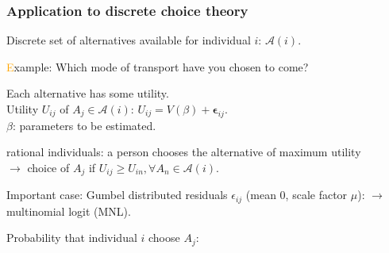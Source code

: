\documentclass{beamer}
\begin{document}
\begin{frame}[fragile]
\frametitle{Application to discrete choice theory}
		
			Discrete {\blue set of alternatives} available for individual $i$:
			$\mathcal{A}(i)$.
			
			\textcolor{orange}Example: Which mode of transport have you chosen to come?
			
			\vspace*{0.3cm}
			
			\begin{minipage}[c]{0.3\linewidth}
				\begin{center}
				\end{center}%
			\end{minipage}
			\begin{minipage}{0.68\linewidth}
				
				Each alternative has some utility.\\
				{\red Utility $U_{ij}$} of $A_j \in \mathcal{A}(i)$:
				$U_{i j} = V(\beta) + \boldsymbol{\epsilon}_{ij}.$\\
				$\beta$: parameters to be estimated.
				
				{\red rational individuals}: a person chooses
				the alternative of {\blue maximum utility}\\
				{\red $\rightarrow$} choice of $A_j$ if $U_{ij} \geq U_{in}, \forall A_n \in
				\mathcal{A}(i)$.
				
			\end{minipage}
			
				Important case: Gumbel distributed residuals $\epsilon_{ij}$ (mean 0,
				scale factor $\mu$):
				{\red $\rightarrow$ multinomial logit} (MNL).
				
				{\blue Probability} that individual $i$ choose $A_j$:
		
\end{frame}

\end{document}
